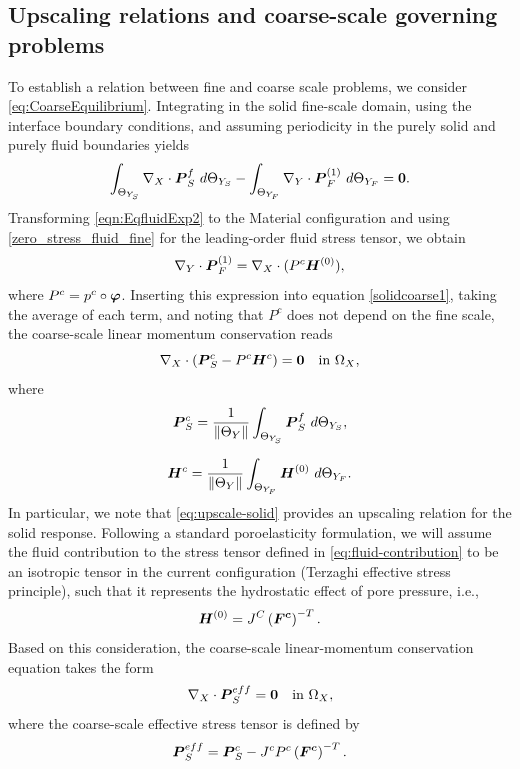 \documentclass[preprint,3p,12pt,number,sort&compress]{elsarticle}
\def\vec   #1{\text{\boldmath $#1$}{}}
\def\ten   #1{\text{\boldmath $#1$}{}}
\begin{document}
\subsection{Upscaling relations and coarse-scale governing problems}
To establish a relation between fine and coarse scale problems, we consider \eqref{eq:CoarseEquilibrium}. Integrating in the solid fine-scale domain, using the interface boundary conditions, and assuming periodicity in the purely solid and purely fluid boundaries yields
\begin{equation}
	\int_{\Theta_{Y_S}} \nabla_X \cdot \ten P_S^{f} \ d \Theta_{Y_S} - 
\int_{\Theta_{Y_{F}}} \nabla_Y \cdot \ten P_F^{(1)}  \ d \Theta_{Y_{F}}  = \vec 0.  \label{solidcoarse1}
\end{equation}
Transforming \eqref{eqn:EqfluidExp2} to the Material configuration and using \eqref{zero_stress_fluid_fine} for the leading-order fluid stress tensor, we obtain
\begin{equation}
	\nabla_Y \cdot \ten P_F^{(1)} =  \nabla_X \cdot ( P^c \ten H^{(0)} ),
\end{equation}	
where $P^c= p^{c} \circ \vec{\varphi}$. 
 Inserting this expression into equation \eqref{solidcoarse1}, taking the average of each term, and noting that $P^c$ does not depend on the fine scale, the coarse-scale linear momentum conservation reads
\begin{equation}
\nabla_X \cdot   (\ten{P}_S^{c} - P^c \ten H^{c} )
 = \vec 0 \quad \text{in } \Omega_{X}, \label{eqn:lmc}
\end{equation}
where
\begin{equation}
    \ten P_S^{c}= \frac{1}{\| \Theta_{Y} \|} \int_{\Theta_{Y_S}}  \ten P_S^{f} \ d \Theta_{Y_S},\label{eq:upscale-solid}
\end{equation}

\begin{equation}
    \ten H^{c}=   \frac{1}{\| \Theta_{Y} \|}
\int_{\Theta_{Y_{F}}}    \ten H^{(0)}     \ d \Theta_{Y_{F}}.
\label{eq:fluid-contribution}
\end{equation}
In particular, we note that \eqref{eq:upscale-solid} provides an upscaling relation for the solid response. Following a standard poroelasticity formulation, we will assume the fluid contribution to the stress tensor defined in \eqref{eq:fluid-contribution} to be an isotropic tensor in the current configuration (Terzaghi effective stress principle), such that it represents the hydrostatic effect of pore pressure, i.e.,
\begin{equation}
    \ten H^{(0)} = J^C \left(\ten{F^c}\right)^{-T}.
\end{equation}
Based on this consideration, the coarse-scale linear-momentum conservation equation takes the form
\begin{equation}
\nabla_X \cdot \ten P_S^{eff}
  = \vec 0 \quad \text{in } \Omega_{X},
\end{equation}
where the coarse-scale effective stress tensor is defined by
\begin{equation}
\ten P_S^{eff} = \ten{P}_S^{c} - J^c P^c \left(\ten{F^c}\right)^{-T}. \label{eqn:effectiveStress}
\end{equation}
\end{document}
